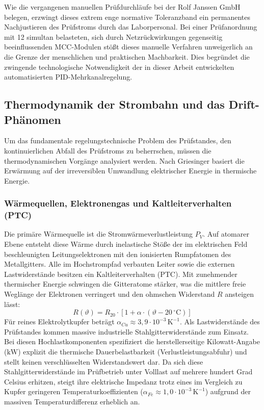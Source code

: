 Wie die vergangenen manuellen Prüfdurchläufe bei der Rolf Janssen GmbH belegen, erzwingt dieses extrem enge normative Toleranzband ein permanentes Nachjustieren des Prüfstroms durch das Laborpersonal. Bei einer Prüfanordnung mit 12 simultan belasteten, sich durch Netzrückwirkungen gegenseitig beeinflussenden MCC-Modulen stößt dieses manuelle Verfahren unweigerlich an die Grenze der menschlichen und praktischen Machbarkeit. Dies begründet die zwingende technologische Notwendigkeit der in dieser Arbeit entwickelten automatisierten PID-Mehrkanalrege\-lung.

\subsection{Thermodynamik der Strombahn und das Drift-Phänomen}
\label{sec:thermodynamik_drift}

Um das fundamentale regelungstechnische Problem des Prüfstandes, den kontinuierlichen Abfall des Prüfstroms zu beherrschen, müssen die thermodynamischen Vorgänge analysiert werden. Nach Griesinger \cite{Griesinger_Waermemanagement} basiert die Erwärmung auf der irreversiblen Umwandlung elektrischer Energie in thermische Energie.
\subsubsection{Wärmequellen, Elektronengas und Kaltleiterverhalten (PTC)}
Die primäre Wärmequelle ist die Stromwärmeverlustleistung $P_V$. Auf atomarer Ebene entsteht diese Wärme durch inelastische Stöße der im elektrischen Feld beschleunigten Leitungselektronen mit den ionisierten Rumpfatomen des Metallgitters. Alle im Hochstrompfad verbauten Leiter sowie die externen Lastwiderstände besitzen ein Kaltleiterverhalten (PTC). Mit zunehmender thermischer Energie schwingen die Gitteratome stärker, was die mittlere freie Weglänge der Elektronen verringert und den ohmschen Widerstand $R$ ansteigen lässt:
\begin{equation}
    R(\vartheta) = R_{20} \cdot \left[ 1 + \alpha \cdot (\vartheta - 20\,^\circ\mathrm{C}) \right]
    \label{eq:ptc_widerstand}
\end{equation}
Für reines Elektrolytkupfer beträgt $\alpha_{Cu} \approx 3,9 \cdot 10^{-3}\,\text{K}^{-1}$. Als Lastwiderstände des Prüfstandes kommen massive industrielle Stahlgitterwiderstände zum Einsatz. Bei diesen Hochlastkomponenten spezifiziert die herstellerseitige Kilowatt-Angabe ($\text{kW}$) explizit die thermische Dauerbelastbarkeit (Verlustleistungsabfuhr) und stellt keinen verschlüsselten Widerstandswert dar. Da sich diese Stahlgitterwiderstände im Prüfbetrieb unter Volllast auf mehrere hundert Grad Celsius erhitzen, steigt ihre elektrische Impedanz trotz eines im Vergleich zu Kupfer geringeren Temperaturkoeffizienten ($\alpha_{Fe} \approx 1,0 \cdot 10^{-3}\,\text{K}^{-1}$) aufgrund der massiven Temperaturdifferenz erheblich an.

